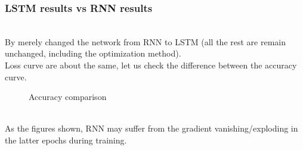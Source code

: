 \documentclass[11pt, a4paper]{article} %
\begin{document}
\subsubsection{LSTM results vs RNN results}
\\ By merely changed the network from RNN to LSTM (all the rest are remain unchanged, including the optimization method).
\\ Loss curve are about the same, let us check the difference between the accuracy curve.  
\begin{figure}[H]
    \centering
    \hfill
    \caption{Accuracy comparison}
    \label{fig:my_label}
\end{figure}
\\ As the figures shown, RNN may suffer from the gradient vanishing/exploding in the latter epochs during training.
\end{document}
